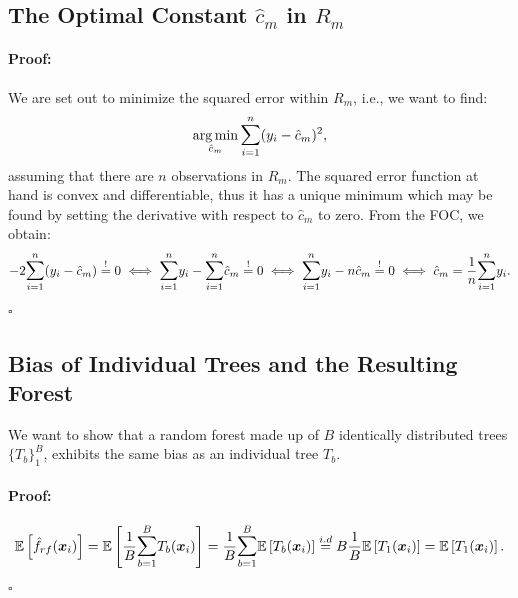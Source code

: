 \documentclass[a4paper,12pt, headsepline]{scrartcl}
\DeclareMathOperator*{\argminA}{arg\,min}
\newenvironment{proof}{\paragraph{Proof:}}{\hfill$\square$}
\numberwithin{equation}{section}
\begin{document}
 \subsection{The Optimal Constant $\hat c_m$ in $R_m$}\label{App:A2}
 \begin{proof}
 	We are set out to minimize the squared error within $R_m$, i.e., we want to find:
 	\[
 	\argminA_{\hat c_m} \mathlarger{\sum}\limits_{i = 1}^{n}(y_i - \hat c_m)^2,
 	\]
 	assuming that there are $n$ observations in $R_m$. The squared error function at hand is convex and differentiable, thus it has a unique minimum which may be found by setting the derivative with respect to $\hat c_m$ to zero. From the FOC, we obtain:
 	\begin{gather*}
 		-2\mathlarger{\sum}\limits_{i = 1}^{n}(y_i - \hat c_m) \overset{!}{=} 0 
 		\iff \mathlarger{\sum}\limits_{i = 1}^{n} y_i - \mathlarger{\sum}\limits_{i = 1}^{n} \hat c_m \overset{!}{=} 0
 		\iff \mathlarger{\sum}\limits_{i = 1}^{n} y_i - n \hat c_m \overset{!}{=} 0
 		\iff \hat c_m = \frac{1}{n} \mathlarger{\sum}\limits_{i = 1}^{n} y_i.
 	\end{gather*}
 \end{proof}
 \newpage
 \subsection{Bias of Individual Trees and the Resulting Forest}\label{App:A3} 
 We want to show that a random forest made up of $B$ identically distributed trees $\{T_b\}_1^B$, exhibits the same bias as an individual tree $T_b$.
 \begin{proof}
 	\[
 	\mathbb{E}\left[ \hat f_{rf}(\bm x_i)\right] =\mathbb{E}\left[ \frac{1}{B} \mathlarger{\sum}\limits_{b = 1}^B T_b(\bm x_i)\right] = \frac{1}{B}\mathlarger{\sum}\limits_{b = 1}^B \mathbb{E}\left[T_b(\bm x_i)\right]\overset{i.d}{=} B \frac{1}{B}\mathbb{E}\left[T_1(\bm x_i)\right] = \mathbb{E}\left[T_1(\bm x_i)\right].
 	\]
 \end{proof}
 
\end{document}
